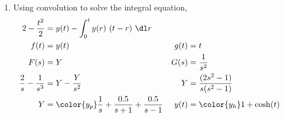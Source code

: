 \begin{enumerate}
    \item Using convolution to solve the integral equation,
          \begin{align}
              2 - \frac{t^2}{2} & = y(t)  - \int_{0}^{t} y(r)\ (t - r)\ \dl r   \\
              f(t)              & = y(t)                                      &
              g(t)              & = t                                           \\
              F(s)              & = Y                                         &
              G(s)              & = \frac{1}{s^2}                               \\
              \frac{2}{s}
              - \frac{1}{s^3}   & = Y - \frac{Y}{s^2}                         &
              Y                 & =  \frac{(2s^2 - 1)}{s(s^2 - 1)}              \\
              Y                 & = \color{y_p} \frac{1}{s} + \frac{0.5}{s+1}
              + \frac{0.5}{s-1} &
              y(t)              & = \color{y_h} 1 + \cosh(t)
          \end{align}


\end{enumerate}
